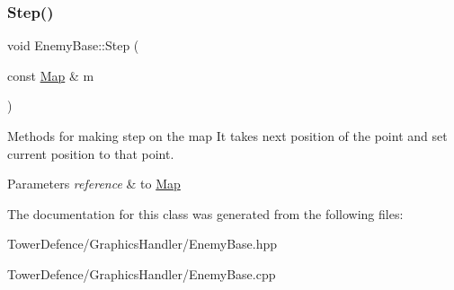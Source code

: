\subsubsection{\texorpdfstring{Step()}{Step()}}
{\footnotesize\ttfamily void Enemy\+Base\+::\+Step (\begin{DoxyParamCaption}\item[{const \mbox{\hyperlink{class_map}{Map}} \&}]{m }\end{DoxyParamCaption})}



Methods for making step on the map It takes next position of the point and set current position to that point. 


\begin{DoxyParams}{Parameters}
{\em reference} & to \mbox{\hyperlink{class_map}{Map}} \\
\hline
\end{DoxyParams}


The documentation for this class was generated from the following files\+:\begin{DoxyCompactItemize}
\item 
Tower\+Defence/\+Graphics\+Handler/Enemy\+Base.\+hpp\item 
Tower\+Defence/\+Graphics\+Handler/Enemy\+Base.\+cpp\end{DoxyCompactItemize}
